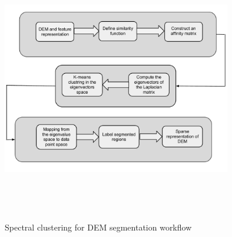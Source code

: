 \documentclass[12pt,letterpaper]{article}
\begin{document}
\begin{figure}[ht!]
\center
      \includegraphics[width=10cm,height=11cm,keepaspectratio]{figs/Spectral_flow.pdf}\\
  \caption{Spectral clustering for DEM segmentation workflow}\label{fig:fig2}
\end{figure}
 
\end{document}
